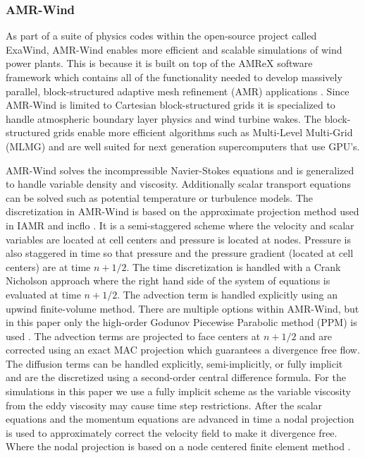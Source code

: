 \subsubsection{AMR-Wind}


As part of a suite of physics codes within the open-source project called ExaWind,
AMR-Wind enables more efficient and scalable simulations of wind power plants.
This is because it is built on top of the AMReX software framework which contains
all of the functionality needed to develop massively parallel, block-structured
adaptive mesh refinement (AMR) applications \cite{AMReX_JOSS}.
Since AMR-Wind is limited to Cartesian block-structured grids it is specialized
to handle atmospheric boundary layer physics and wind turbine wakes.
The block-structured grids enable more efficient algorithms such as
Multi-Level Multi-Grid (MLMG) \cite{AMReX_JOSS}
and are well suited for next generation supercomputers that use GPU's.

AMR-Wind solves the incompressible Navier-Stokes equations and is generalized to
handle variable density and viscosity. Additionally scalar transport equations can be
solved such as potential temperature or turbulence models. The discretization in AMR-Wind
is based on the approximate projection method used in IAMR \cite{almgren1998conservative}
and incflo \cite{sverdrup2018highly}. It is a semi-staggered scheme where the velocity and scalar
variables are located at cell centers and pressure is located at nodes. Pressure is also staggered
in time so that pressure and the pressure gradient (located at cell centers) are at time $n+1/2$.
The time discretization is handled with a Crank Nicholson approach where the right hand side
of the system of equations is evaluated at time $n+1/2$. The advection term is handled explicitly
using an upwind finite-volume method. There are multiple options
within AMR-Wind, but in this paper only the high-order Godunov Piecewise Parabolic
method (PPM) is used \cite{Colella1984}. The advection terms are projected to face
centers at $n+1/2$ and are corrected using an exact MAC projection \cite{almgren1998conservative}
which guarantees a divergence free flow. The diffusion terms can be handled explicitly, semi-implicitly,
or fully implicit and are the discretized using a second-order central difference formula.
For the simulations in this paper we use a fully implicit scheme as the variable viscosity
from the eddy viscosity may cause time step restrictions. After the scalar equations
and the momentum equations are advanced in time a nodal projection is used to
approximately correct the velocity field to make it divergence free. Where the nodal projection
is based on a node centered finite element method \cite{almgren1998conservative}.

